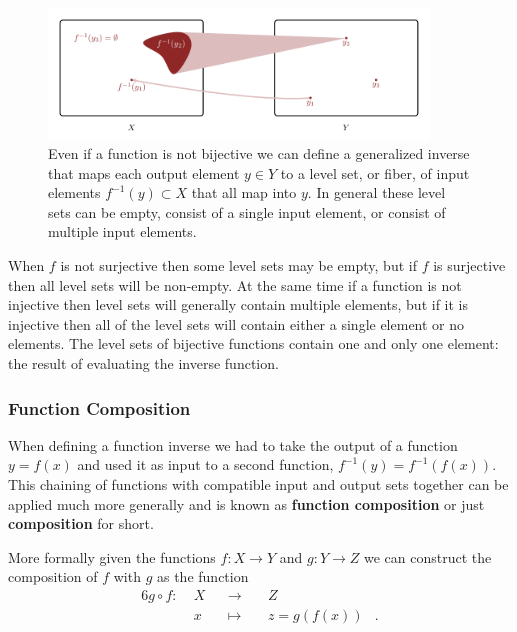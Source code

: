 \documentclass[
  letterpaper,
  DIV=11,
  numbers=noendperiod]{scrartcl}
\begin{document}
\begin{figure}

{\centering \includegraphics[width=0.9\textwidth,height=\textheight]{figures/maps/fibers/fibers.pdf}

}

\caption{\label{fig-fibers}Even if a function is not bijective we can
define a generalized inverse that maps each output element \(y \in Y\)
to a level set, or fiber, of input elements \(f^{-1}(y) \subset X\) that
all map into \(y\). In general these level sets can be empty, consist of
a single input element, or consist of multiple input elements.}

\end{figure}

When \(f\) is not surjective then some level sets may be empty, but if
\(f\) is surjective then all level sets will be non-empty. At the same
time if a function is not injective then level sets will generally
contain multiple elements, but if it is injective then all of the level
sets will contain either a single element or no elements. The level sets
of bijective functions contain one and only one element: the result of
evaluating the inverse function.

\hypertarget{function-composition}{%
\subsubsection{Function Composition}\label{function-composition}}

When defining a function inverse we had to take the output of a function
\(y = f(x)\) and used it as input to a second function,
\(f^{-1}(y) = f^{-1}(f(x))\). This chaining of functions with compatible
input and output sets together can be applied much more generally and is
known as \textbf{function composition} or just \textbf{composition} for
short.

More formally given the functions \(f : X \rightarrow Y\) and
\(g : Y \rightarrow Z\) we can construct the composition of \(f\) with
\(g\) as the function \begin{alignat*}{6}
g \circ f :\; & X & &\rightarrow& \; & Z &
\\
& x & &\mapsto& & z = g(f(x)) &.
\end{alignat*}
\end{document}
